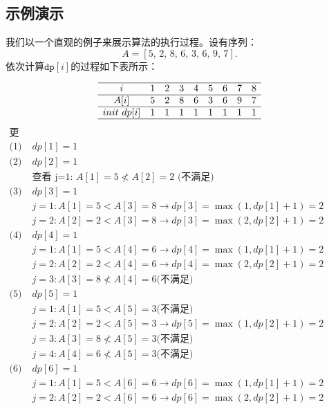 \documentclass[UTF8]{ctexart}
\begin{document}
\subsection{示例演示}
我们以一个直观的例子来展示算法的执行过程。设有序列：
\[
    A = [5, \,2, \,8, \,6, \,3, \,6, \,9, \,7].
\]
依次计算$\texttt{dp}[i]$的过程如下表所示：

\[
\begin{array}{ccccccccc}
\hline
i             & 1 & 2 & 3 & 4 & 5 & 6 & 7 & 8 \\
\hline
A[i]          & 5 & 2 & 8 & 6 & 3 & 6 & 9 & 7 \\
\hline
init~dp[i]     & 1 & 1 & 1 & 1 & 1 & 1 & 1 & 1 \\
\hline
\end{array}
\]
\[
\begin{array}{c|cccccccc}
\text{更新过程} &   &   &   &   &   &   &   &   \\
\text{(1) i=1} & dp[1]=1 & & & & & & & \\
\text{(2) i=2} & dp[2]=1 & & & & & & & \\
   & \text{查看 j=1: } A[1]=5 \not< A[2]=2 \text{ (不满足)} \\
\text{(3) i=3} & dp[3]=1 & & & & & & & \\
   & j=1: A[1]=5 < A[3]=8 \rightarrow dp[3]=\max(1, dp[1]+1)=2 \\
   & j=2: A[2]=2 < A[3]=8 \rightarrow dp[3]=\max(2, dp[2]+1)=2 \\
\text{(4) i=4} & dp[4]=1 & & & & & & & \\
   & j=1: A[1]=5 < A[4]=6 \rightarrow dp[4]=\max(1, dp[1]+1)=2 \\
   & j=2: A[2]=2 < A[4]=6 \rightarrow dp[4]=\max(2, dp[2]+1)=2 \\
   & j=3: A[3]=8 \not< A[4]=6 \text{(不满足)} \\
\text{(5) i=5} & dp[5]=1 & & & & & & & \\
   & j=1: A[1]=5 < A[5]=3 \text{(不满足)} \\
   & j=2: A[2]=2 < A[5]=3 \rightarrow dp[5]=\max(1, dp[2]+1)=2 \\
   & j=3: A[3]=8 \not< A[5]=3 \text{(不满足)} \\
   & j=4: A[4]=6 \not< A[5]=3 \text{(不满足)} \\
\text{(6) i=6} & dp[6]=1 & & & & & & & \\
   & j=1: A[1]=5 < A[6]=6 \rightarrow dp[6]=\max(1, dp[1]+1)=2 \\
   & j=2: A[2]=2 < A[6]=6 \rightarrow dp[6]=\max(2, dp[2]+1)=2 \\

\end{array}\]
\end{document}
